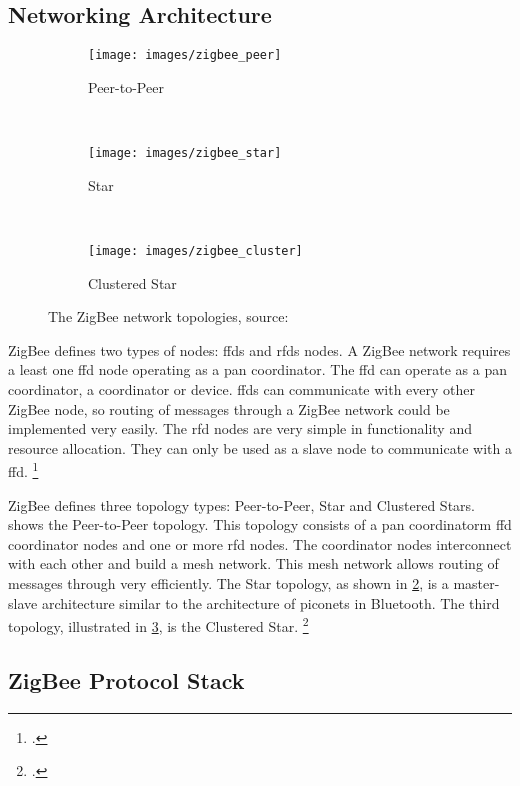 \subsection{Networking Architecture}

\begin{figure}[ht]
  \centering
  \begin{subfigure}[t]{4cm}
    \texttt{[image: images/zigbee\_peer]}
    \caption{Peer-to-Peer}
    \label{fig:zigbee_peer}
  \end{subfigure}
  ~
  \begin{subfigure}[t]{4cm}
    \texttt{[image: images/zigbee\_star]}
    \caption{Star}
    \label{fig:zigbee_star}
  \end{subfigure}
  ~
  \begin{subfigure}[t]{6cm}
    \texttt{[image: images/zigbee\_cluster]}
    \caption{Clustered Star}
    \label{fig:zigbee_cluster}
  \end{subfigure}
  \caption{The ZigBee network topologies, source: \cite[690]{Garg2007}}
  \label{fig:zigbee_topology}
\end{figure}

ZigBee defines two types of nodes: \glspl{ffd} and \glspl{rfd} nodes. A ZigBee network requires a least one \gls{ffd} node operating as a \gls{pan} coordinator. The \gls{ffd} can operate as a \gls{pan} coordinator, a coordinator or device. \glspl{ffd} can communicate with every other ZigBee node, so routing of messages through a ZigBee network could be implemented very easily. The \gls{rfd} nodes are very simple in functionality and resource allocation. They can only be used as a slave node to communicate with a \gls{ffd}. \footcite[Cf.][477-478]{Pahlavan2009}

ZigBee defines three topology types: Peer-to-Peer, Star and Clustered Stars.  shows the Peer-to-Peer topology. This topology consists of a \gls{pan} coordinatorm \gls{ffd} coordinator nodes and one or more \gls{rfd} nodes. The coordinator nodes interconnect with each other and build a mesh network. This mesh network allows routing of messages through very efficiently. The Star topology, as shown in \cref{fig:zigbee_star}, is a master-slave architecture similar to the architecture of piconets in Bluetooth. The third topology, illustrated in \cref{fig:zigbee_cluster}, is the Clustered Star. \footcite[Cf.][689-691]{Garg2007}

\subsection{ZigBee Protocol Stack}

